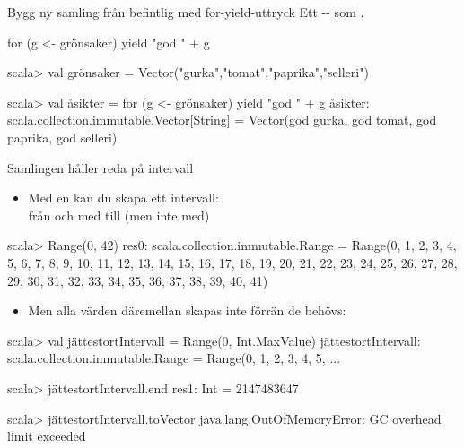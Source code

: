 \begin{Slide}{Bygg ny samling från befintlig med for-yield-uttryck}
Ett -- som .

\begin{Code}[basicstyle=\ttfamily\fontsize{12}{14}\selectfont]
for (g <- grönsaker) yield "god " + g
\end{Code}

\begin{REPL}
scala> val grönsaker = Vector("gurka","tomat","paprika","selleri")

scala> val åsikter = for (g <- grönsaker) yield "god " + g
åsikter: scala.collection.immutable.Vector[String] =
  Vector(god gurka, god tomat, god paprika, god selleri)
\end{REPL}

\end{Slide}


\begin{Slide}{Samlingen  håller reda på intervall}
\begin{itemize}
\item Med en  kan du skapa ett intervall: \\ från och med  till (men inte med) 
\end{itemize}

\begin{REPLnonum}
scala> Range(0, 42)
res0: scala.collection.immutable.Range =
  Range(0, 1, 2, 3, 4, 5, 6, 7, 8, 9, 10, 11, 12, 13, 14,
    15, 16, 17, 18, 19, 20, 21, 22, 23, 24, 25, 26, 27, 28,
    29, 30, 31, 32, 33, 34, 35, 36, 37, 38, 39, 40, 41)
\end{REPLnonum}

\begin{itemize}
\item Men alla värden däremellan skapas inte förrän de behövs:
\end{itemize}

\begin{REPL}
scala> val jättestortIntervall = Range(0, Int.MaxValue)
jättestortIntervall: scala.collection.immutable.Range = Range(0, 1, 2, 3, 4, 5, ...

scala> jättestortIntervall.end
res1: Int = 2147483647

scala> jättestortIntervall.toVector
java.lang.OutOfMemoryError: GC overhead limit exceeded
\end{REPL}

\end{Slide}

